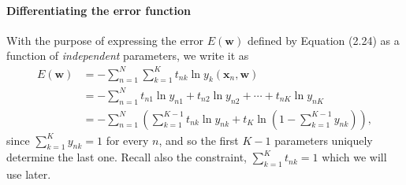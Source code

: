 \documentclass[12pt, a4paper]{article}
\newcommand{\vect}[1]{\bm{#1}}
\begin{document}
\paragraph{Differentiating the error function}
With the purpose of expressing the error $E(\vect{w})$ defined by Equation (2.24) as a function of \emph{independent} parameters, we write it as
\begin{align*}
	E(\vect{w})
	&=
	- \sum_{n=1}^{N}  \sum_{k=1}^{K} t_{nk} \ln y_k (\vect{x}_n, \vect{w}) \\
	&= 
	- \sum_{n=1}^{N}  t_{n1} \ln y_{n1} + t_{n2} \ln y_{n2} + \cdots + t_{nK} \ln y_{nK}\\
	&= 
	- \sum_{n=1}^{N}  \left( \sum_{k=1}^{K-1} t_{nk} \ln y_{nk} 
	+ t_{K}
	\ln \left( 1 - \sum_{k=1}^{K-1} y_{nk} \right)
	\right),
\end{align*}
since $\sum_{k=1}^{K} y_{nk} = 1$ for every $n$, and so the first $K-1$ parameters uniquely determine the last one.
Recall also the constraint, $\sum_{k=1}^{K} t_{nk} = 1$ which we will use later.
\end{document}
